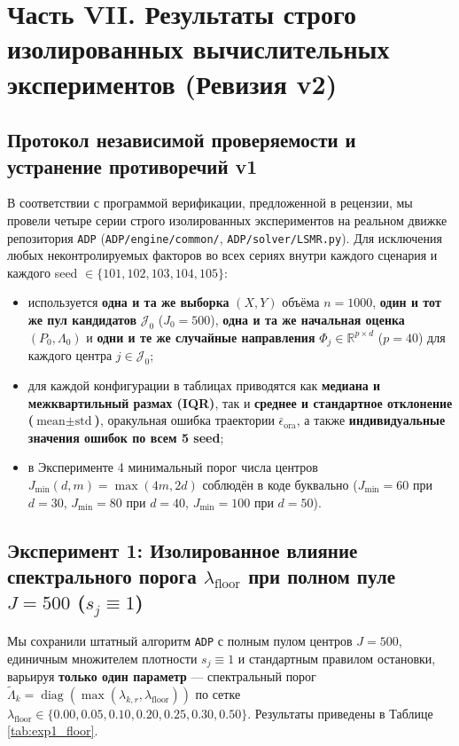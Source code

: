\documentclass[11pt,a4paper]{article}
\newcommand{\R}{\mathbb{R}}
\newcommand{\JJJ}{\mathcal{J}}
\DeclareMathOperator{\diag}{diag}
\theoremstyle{definition}
\theoremstyle{remark}
\begin{document}
\section{Часть VII. Результаты строго изолированных вычислительных экспериментов (Ревизия v2)}
\label{sec:part7}

\subsection{Протокол независимой проверяемости и устранение противоречий v1}

В соответствии с программой верификации, предложенной в рецензии, мы провели четыре серии строго изолированных экспериментов на реальном движке репозитория \texttt{ADP} (\texttt{ADP/engine/common/}, \texttt{ADP/solver/LSMR.py}). Для исключения любых неконтролируемых факторов во всех сериях внутри каждого сценария и каждого seed $\in \{101, 102, 103, 104, 105\}$:
\begin{itemize}
    \item используется \textbf{одна и та же выборка} $(X, Y)$ объёма $n = 1000$, \textbf{один и тот же пул кандидатов} $\JJJ_0$ ($J_0 = 500$), \textbf{одна и та же начальная оценка} $(P_0, \Lambda_0)$ и \textbf{одни и те же случайные направления} $\Phi_j \in \R^{p \times d}$ ($p = 40$) для каждого центра $j \in \JJJ_0$;
    \item для каждой конфигурации в таблицах приводятся как \textbf{медиана и межквартильный размах (IQR)}, так и \textbf{среднее и стандартное отклонение ($\text{mean} \pm \text{std}$)}, оракульная ошибка траектории $\bar{\epsilon}_{\mathrm{ora}}$, а также \textbf{индивидуальные значения ошибок по всем 5 seed};
    \item в Эксперименте 4 минимальный порог числа центров $J_{\min}(d,m) = \max(4m, 2d)$ соблюдён в коде буквально ($J_{\min} = 60$ при $d=30$, $J_{\min} = 80$ при $d=40$, $J_{\min} = 100$ при $d=50$).
\end{itemize}

\subsection{Эксперимент 1: Изолированное влияние спектрального порога $\lambda_{\mathrm{floor}}$ при полном пуле $J = 500$ ($s_j \equiv 1$)}

Мы сохранили штатный алгоритм \texttt{ADP} с полным пулом центров $J = 500$, единичным множителем плотности $s_j \equiv 1$ и стандартным правилом остановки, варьируя \textbf{только один параметр} --- спектральный порог $\widetilde{\Lambda}_k = \diag(\max(\lambda_{k,r}, \lambda_{\mathrm{floor}}))$ по сетке $\lambda_{\mathrm{floor}} \in \{0.00, 0.05, 0.10, 0.20, 0.25, 0.30, 0.50\}$. Результаты приведены в Таблице \ref{tab:exp1_floor}.
\end{document}
